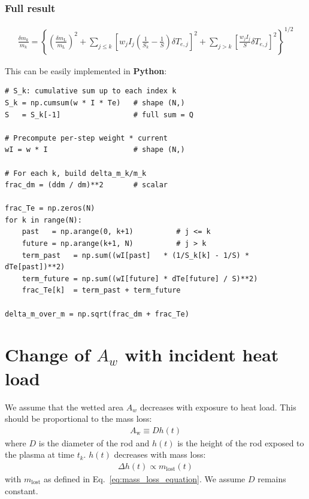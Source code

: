\documentclass[11pt,twoside]{article}
\begin{document}
\subsubsection{Full result}
\begin{align}
    \boxed{
    \frac{\delta m_k}{m_k} = \left\{
        \left(\frac{\delta m_{\mathrm{L}}}{m_{\mathrm{L}}}\right)^2
        +
        \sum_{j\leq k} \left[w_j I_j \left( \frac{1}{S_k} - \frac{1}{S}\right)\delta T_{e,j}\right]^2
        +
        \sum_{j > k} \left[ \frac{w_j I_j}{S}\delta T_{e,j}\right]^2
    \right\}^{1/2} 
    }
\end{align}

This can be easily implemented in \textbf{Python}:
\begin{lstlisting}[caption={Example code to estimate $\delta m_k$ in Python}]
# S_k: cumulative sum up to each index k
S_k = np.cumsum(w * I * Te)   # shape (N,)
S   = S_k[-1]                 # full sum = Q

# Precompute per-step weight * current
wI = w * I                    # shape (N,)

# For each k, build delta_m_k/m_k
frac_dm = (ddm / dm)**2       # scalar

frac_Te = np.zeros(N)
for k in range(N):
    past   = np.arange(0, k+1)          # j <= k
    future = np.arange(k+1, N)          # j > k
    term_past   = np.sum((wI[past]   * (1/S_k[k] - 1/S) * dTe[past])**2)
    term_future = np.sum((wI[future] * dTe[future] / S)**2)
    frac_Te[k]  = term_past + term_future

delta_m_over_m = np.sqrt(frac_dm + frac_Te)
\end{lstlisting}

\section{Change of $A_w$ with incident heat load}
We assume that the wetted area $A_w$ decreases with exposure to heat load. This should be proportional to the mass loss:
\begin{align*}
    A_{\mathrm{w}} \equiv Dh(t)
\end{align*}
where $D$ is the diameter of the rod and $h(t)$ is the height of the rod exposed to the plasma at time $t_k$. $h(t)$ decreases with mass loss: 
\begin{align*}
    \Delta h(t) \propto m_{\mathrm{lost}}(t) 
\end{align*}
with $m_{\mathrm{lost}}$ as defined in Eq.~\eqref{eq:mass_loss_equation}. We assume $D$ remains constant.
\end{document}
